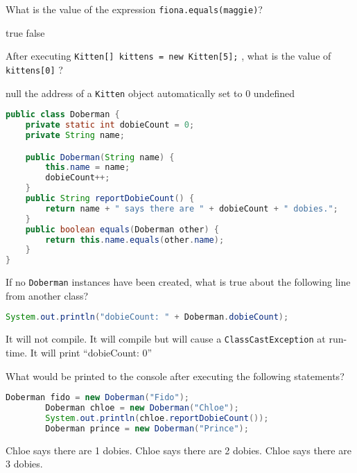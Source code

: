 \documentclass[addpoints,9pt]{exam}
\begin{document}
\begin{questions}
\question[3] What is the value of the expression {\tt fiona.equals(maggie)}?

\begin{choices}
\correctchoice true
\choice false
\end{choices}

\question[3] After executing {\tt Kitten[] kittens = new Kitten[5];} , what is the value of {\tt kittens[0]} ?

\begin{choices}
\correctchoice null
\choice the address of a {\tt Kitten} object
\choice automatically set to 0
\choice undefined
\end{choices}

\newpage

\begin{lstlisting}[language=Java]
public class Doberman {
    private static int dobieCount = 0;
    private String name;

    public Doberman(String name) {
        this.name = name;
        dobieCount++;
    }
    public String reportDobieCount() {
        return name + " says there are " + dobieCount + " dobies.";
    }
    public boolean equals(Doberman other) {
        return this.name.equals(other.name);
    }
}
\end{lstlisting}

\question[3] If no {\tt Doberman} instances have been created, what is true about the following line from another class?
\begin{lstlisting}[language=Java]
        System.out.println("dobieCount: " + Doberman.dobieCount);
\end{lstlisting}
\begin{choices}
\correctchoice It will not compile.
\choice It will compile but will cause a {\tt ClassCastException} at run-time.
\choice It will print ``dobieCount: 0''
\end{choices}

\question[3] What would be printed to the console after executing the following statements?
\begin{lstlisting}[language=Java]
        Doberman fido = new Doberman("Fido");
        Doberman chloe = new Doberman("Chloe");
        System.out.println(chloe.reportDobieCount());
        Doberman prince = new Doberman("Prince");
\end{lstlisting}

\begin{choices}
\choice Chloe says there are 1 dobies.
\correctchoice Chloe says there are 2 dobies.
\choice Chloe says there are 3 dobies.


\end{choices}
\end{questions}
\end{document}
